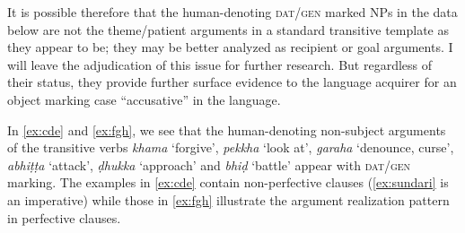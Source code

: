 \documentclass[output=paper,
modfonts
]{LSP/langsci}
\begin{document}
It is possible therefore that the human-denoting \textsc{dat/gen} marked NPs in the data below are not the theme/patient  arguments in a standard transitive template as they appear to be; they may be  better analyzed as recipient or goal arguments. I will leave the adjudication of this issue for further research. But regardless of their status, they provide further surface evidence to the language acquirer for an object marking case ``accusative'' in the language.



In \cref{ex:cde} and \cref{ex:fgh}, we see that the human-denoting non-subject arguments of the transitive verbs \textit{khama} `forgive', \textit{pekkha} `look at', \textit{garaha} `denounce, curse', \textit{abhiṭṭa} `attack',   \textit{ḍhukka} `approach' and \textit{bhiḍ} `battle'  appear with \textsc{dat/gen} marking. The examples in \cref{ex:cde} contain non-perfective  clauses (\cref{ex:sundari} is an imperative) while those in \cref{ex:fgh} illustrate the argument realization pattern in perfective clauses.
\end{document}

